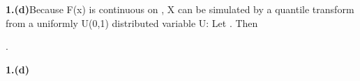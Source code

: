 \documentclass{article}
\begin{document}
\begin{Maple Normal}{
\begin{Maple Normal}{
}\end{Maple Normal}
}\end{Maple Normal}
\begin{Maple Normal}{
\begin{Maple Normal}{
\textbf{1.(d)}Because F(x) is continuous on
, X can be simulated by a quantile transform from a uniformly U(0,1) distributed variable U: Let
. Then}\end{Maple Normal}

\begin{Maple Normal}{
.}\end{Maple Normal}

}\end{Maple Normal}

\begin{Maple Normal}{
\begin{Maple Normal}{
}\end{Maple Normal}
}\end{Maple Normal}
\begin{Maple Normal}{
\begin{Maple Normal}{
\textbf{1.(d)}}\end{Maple Normal}

}\end{Maple Normal}
\end{document}
